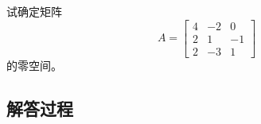 \begin{example}[矩阵零空间计算]
    试确定矩阵
    \[
    A = \begin{bmatrix}
    4 & -2 & 0 \\
    2 & 1 & -1 \\
    2 & -3 & 1
    \end{bmatrix}
    \]
    的零空间。
    \end{example}
    
    \subsection*{解答过程}
    
